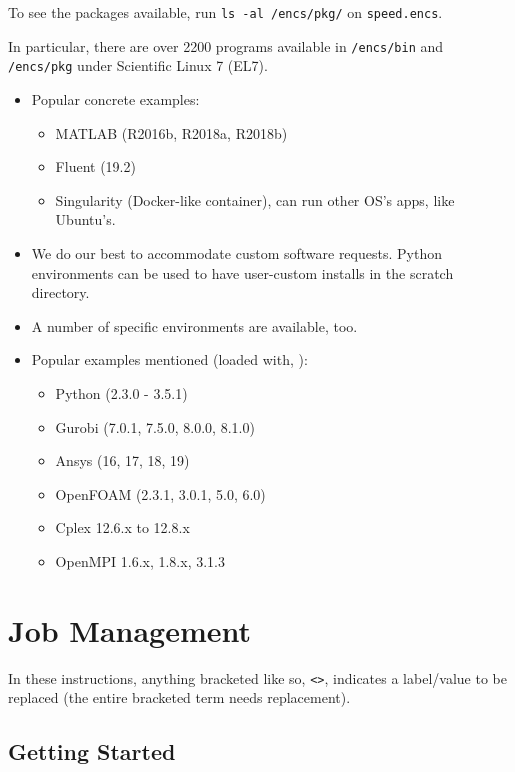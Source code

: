 \documentclass{easychair}
\begin{document}
To see the packages available, run \texttt{ls -al /encs/pkg/} on \texttt{speed.encs}.


In particular, there are over 2200 programs available in
\texttt{/encs/bin} and \texttt{/encs/pkg} under Scientific Linux 7 (EL7).

\begin{itemize}
	\item 
Popular concrete examples:
\begin{itemize}
	\item 
MATLAB (R2016b, R2018a, R2018b)
	\item 
Fluent (19.2)
	\item 
Singularity (Docker-like container), can run other OS's apps, like Ubuntu's.
\end{itemize}
	\item 
We do our best to accommodate custom software requests.
Python environments can be used to have user-custom installs
in the scratch directory.
	\item 
A number of specific environments are available, too.
	\item 
Popular examples mentioned (loaded with, ):
\begin{itemize}
	\item 
Python (2.3.0 - 3.5.1)
	\item 
Gurobi (7.0.1, 7.5.0, 8.0.0, 8.1.0)
	\item 
Ansys (16, 17, 18, 19)
	\item 
OpenFOAM (2.3.1, 3.0.1, 5.0, 6.0)
	\item 
Cplex 12.6.x to 12.8.x
	\item 
OpenMPI 1.6.x, 1.8.x, 3.1.3
\end{itemize}
\end{itemize}


\section{Job Management}
\label{sect:job-management}

In these instructions, anything bracketed like so, \verb+<>+, indicates a
label/value to be replaced (the entire bracketed term needs replacement).

\subsection{Getting Started}
\end{document}
